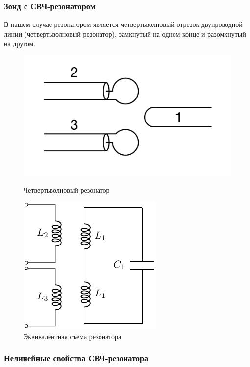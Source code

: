 \documentclass[10pt,pdf,hyperref={unicode}, dvipsnames]{beamer}
\begin{document}
\begin{frame}
	\frametitle{Зонд с СВЧ-резонатором}
	В нашем случае резонатором является четвертьволновый отрезок двупроводной линии (четвертьволновый резонатор), замкнутый на одном конце и разомкнутый на другом. 
	\begin{figure}[H]
	\begin{minipage}{0.49\linewidth}
			\centering
			\includegraphics[width=\linewidth]{fig/resonator}
			\caption{Четвертьволновый резонатор}
			\label{fig:resonator}
	\end{minipage}
	\begin{minipage}{0.49\linewidth}		
			\centering
			\includegraphics[]{chem/chem1}
			\caption{Эквивалентная съема резонатора}
			\label{fig:chem1}
	\end{minipage}
	\end{figure}
\end{frame}

\begin{frame}[t]\frametitle{Нелинейные свойства СВЧ-резонатора}
    


\end{frame}
\end{document}
